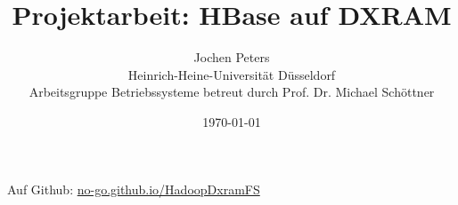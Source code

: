 \documentclass[a4paper,11pt]{article}
\title{Projektarbeit: HBase auf DXRAM}
\author{Jochen Peters\\ Heinrich-Heine-Universität Düsseldorf\\ Arbeitsgruppe Betriebssysteme betreut durch Prof. Dr. Michael Schöttner}
\date{\today}
\begin{document}
\maketitle
Auf Github: \href{https://no-go.github.io/HadoopDxramFS/}{no-go.github.io/HadoopDxramFS}



\end{document}
